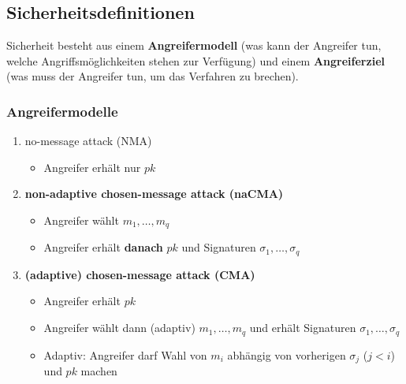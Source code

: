 \documentclass[12pt,A4]{extarticle}
\newcommand{\highlight}[1]{\textcolor{highlightColor}{\textbf{#1}}}
\begin{document}
\subsection{Sicherheitsdefinitionen}
Sicherheit besteht aus einem \highlight{Angreifermodell} (was kann der Angreifer tun, welche Angriffsmöglichkeiten stehen zur Verfügung) und einem \highlight{Angreiferziel} (was muss der Angreifer tun, um das Verfahren zu brechen).

\subsubsection{Angreifermodelle}
\begin{enumerate}
  \item{no-message attack (NMA)
              \begin{itemize}
                \item{Angreifer erhält nur $pk$}
              \end{itemize}
        }
  \item{\highlight{non-adaptive chosen-message attack (naCMA)}
              \begin{itemize}
                \item{Angreifer wählt $m_1, \dots, m_q$}
                \item{Angreifer erhält \textbf{danach} $pk$ und Signaturen $\sigma_1, \dots, \sigma_q$}
              \end{itemize}
        }
  \item{\highlight{(adaptive) chosen-message attack (CMA)}
              \begin{itemize}
                \item{Angreifer erhält $pk$}
                \item{Angreifer wählt dann (adaptiv) $m_1, \dots, m_q$ und erhält Signaturen $\sigma_1, \dots, \sigma_q$}
                \item{Adaptiv: Angreifer darf Wahl von $m_i$ abhängig von vorherigen $\sigma_j$ ($j < i$) und $pk$ machen}
              \end{itemize}
        }
\end{enumerate}
\end{document}
